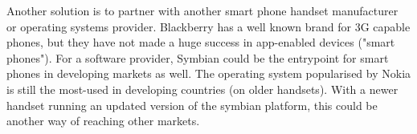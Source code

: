 \documentclass{article}
\begin{document}
Another solution is to partner with another smart phone handset manufacturer or operating systems provider. Blackberry has a well known brand for 3G capable phones, but they have not made a huge success in app-enabled devices ("smart phones"). For a software provider, Symbian could be the entrypoint for smart phones in developing markets as well. The operating system popularised by Nokia is still the most-used in developing countries (on older handsets). With a newer handset running an updated version of the symbian platform, this could be another way of reaching other markets.


\end{document}
